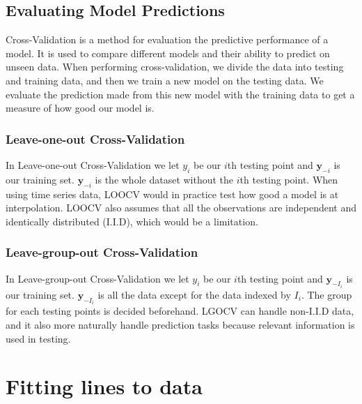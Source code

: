 \subsection{Evaluating Model Predictions}

\noindent Cross-Validation is a method for evaluation the predictive performance of a model. It is used to compare different models and their ability to predict on unseen data. When performing cross-validation, we divide the data into testing and training data, and then we train a new model on the testing data. We evaluate the prediction made from this new model with the training data to get a measure of how good our model is. \cite[p.~1--2]{liu2024leavegroupoutcrossvalidationlatentgaussian}

\newpage

\subsubsection{Leave-one-out Cross-Validation}

\noindent In Leave-one-out Cross-Validation we let $y_i$ be our $i$th testing point and $\boldsymbol{y}_{-i}$ is our training set. $\boldsymbol{y}_{-i}$ is the whole dataset without the $i$th testing point. When using time series data, LOOCV would in practice test how good a model is at interpolation. LOOCV also assumes that all the observations are independent and identically distributed (I.I.D), which would be a limitation. \cite[p.~3]{liu2024leavegroupoutcrossvalidationlatentgaussian}



\subsubsection{Leave-group-out Cross-Validation}

\noindent In Leave-group-out Cross-Validation we let $y_i$ be our $i$th testing point and $\boldsymbol{y}_{-I_i}$ is our training set. $\boldsymbol{y}_{-I_i}$ is all the data except for the data indexed by $I_i$. The group for each testing points is decided beforehand. LGOCV can handle non-I.I.D data, and it also more naturally handle prediction tasks because relevant information is used in testing. \cite[p.~3]{liu2024leavegroupoutcrossvalidationlatentgaussian}



\section{Fitting lines to data}

